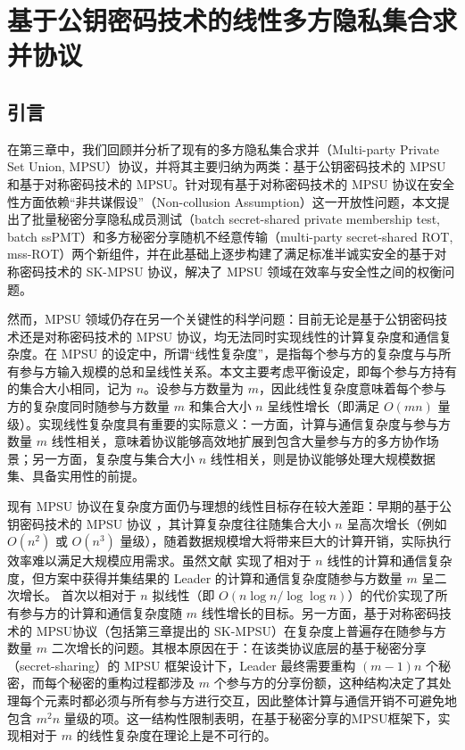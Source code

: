 \chapter{基于公钥密码技术的线性多方隐私集合求并协议}

\section{引言}

在第三章中，我们回顾并分析了现有的多方隐私集合求并（Multi-party Private Set Union, MPSU）协议，并将其主要归纳为两类：基于公钥密码技术的 MPSU 和基于对称密码技术的 MPSU。针对现有基于对称密码技术的 MPSU 协议在安全性方面依赖“非共谋假设”（Non-collusion Assumption）这一开放性问题，本文提出了批量秘密分享隐私成员测试（batch secret-shared private membership test, batch ssPMT）和多方秘密分享随机不经意传输（multi-party secret-shared ROT, mss-ROT）两个新组件，并在此基础上逐步构建了满足标准半诚实安全的基于对称密码技术的 SK-MPSU 协议，解决了 MPSU 领域在效率与安全性之间的权衡问题。

然而，MPSU 领域仍存在另一个关键性的科学问题：目前无论是基于公钥密码技术还是对称密码技术的 MPSU 协议，均无法同时实现线性的计算复杂度和通信复杂度。在 MPSU 的设定中，所谓“线性复杂度”，是指每个参与方的复杂度与与所有参与方输入规模的总和呈线性关系。本文主要考虑平衡设定，即每个参与方持有的集合大小相同，记为 $n$。设参与方数量为 $m$，因此线性复杂度意味着每个参与方的复杂度同时随参与方数量 $m$ 和集合大小 $n$ 呈线性增长（即满足 $O(mn)$ 量级）。实现线性复杂度具有重要的实际意义：一方面，计算与通信复杂度与参与方数量 $m$ 线性相关，意味着协议能够高效地扩展到包含大量参与方的多方协作场景；另一方面，复杂度与集合大小 $n$ 线性相关，则是协议能够处理大规模数据集、具备实用性的前提。

现有 MPSU 协议在复杂度方面仍与理想的线性目标存在较大差距：早期的基于公钥密码技术的 MPSU 协议 \cite{KS-CRYPTO-2005,Frikken-ACNS-2007}，其计算复杂度往往随集合大小 $n$ 呈高次增长（例如 $O(n^2)$ 或 $O(n^3)$ 量级），随着数据规模增大将带来巨大的计算开销，实际执行效率难以满足大规模应用需求。虽然文献 \cite{VCE22} 实现了相对于 $n$ 线性的计算和通信复杂度，但方案中获得并集结果的 Leader 的计算和通信复杂度随参与方数量 $m$ 呈二次增长。\cite{GNT-eprint-2023} 首次以相对于 $n$ 拟线性（即 $O(n \log n / \log \log n)$）的代价实现了所有参与方的计算和通信复杂度随 $m$ 线性增长的目标。另一方面，基于对称密码技术的 MPSU协议（包括第三章提出的 SK-MPSU）在复杂度上普遍存在随参与方数量 $m$ 二次增长的问题。其根本原因在于：在该类协议底层的基于秘密分享（secret-sharing）的 MPSU 框架设计下，Leader 最终需要重构 $(m-1)n$ 个秘密，而每个秘密的重构过程都涉及 $m$ 个参与方的分享份额，这种结构决定了其处理每个元素时都必须与所有参与方进行交互，因此整体计算与通信开销不可避免地包含 $m^2 n$ 量级的项。这一结构性限制表明，在基于秘密分享的MPSU框架下，实现相对于 $m$ 的线性复杂度在理论上是不可行的。

